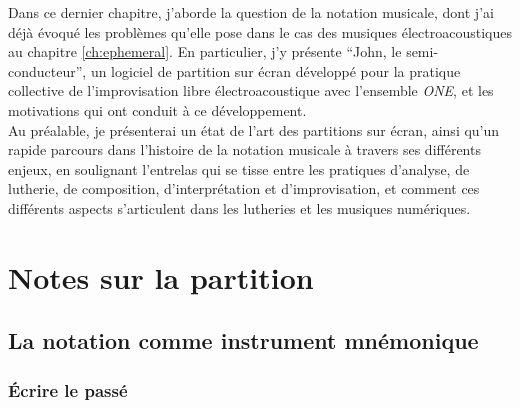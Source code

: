 \noindent Dans ce dernier chapitre, j'aborde la question de la notation musicale, dont j'ai déjà évoqué les problèmes qu'elle pose dans le cas des musiques électroacoustiques au chapitre \ref{ch:ephemeral}. En particulier, j'y présente ``John, le semi-conducteur'', un logiciel de partition sur écran développé pour la pratique collective de l'improvisation libre électroacoustique avec l'ensemble \textit{ONE}, et les motivations qui ont conduit à ce développement.\\
\indent Au préalable, je présenterai un état de l'art des partitions sur écran, ainsi qu'un rapide parcours dans l'histoire de la notation musicale à travers ses différents enjeux, en soulignant l'entrelas qui se tisse entre les pratiques d'analyse, de lutherie, de composition, d'interprétation et d'improvisation, et comment ces différents aspects s'articulent dans les lutheries et les musiques numériques.

\clearpage

\section{Notes sur la partition}

\subsection{La notation comme instrument mnémonique}

\subsubsection{Écrire le passé}

